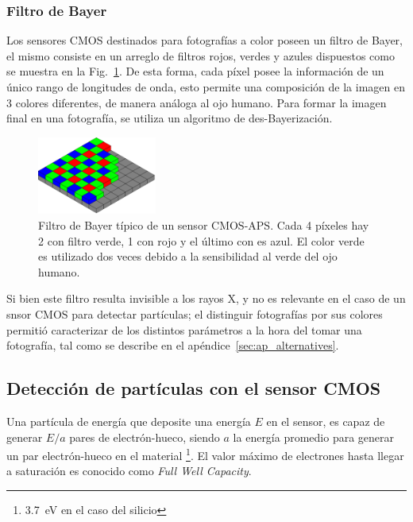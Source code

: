 \documentclass[twoside,twocolumn]{article}
\begin{document}
    \subsubsection*{\hspace{5mm}Filtro de Bayer}\label{sec:intro:bayer}
      Los sensores CMOS destinados para fotografías a color poseen un filtro de Bayer, 
      el mismo consiste en un arreglo de filtros rojos, verdes y azules dispuestos como se muestra en la Fig.~\ref{fig:bayer}.
      De esta forma, cada píxel posee la información de un único rango de longitudes de onda, 
      esto permite una composición de la imagen en 3 colores diferentes, de manera análoga al ojo humano.
      Para formar la imagen final en una fotografía, se utiliza un algoritmo de des-Bayerización.\cite{picamera}

      \begin{figure}[h]
        \centering
        \includegraphics[width=0.35\textwidth]{figures/Bayer_pattern.png}
        \caption{Filtro de Bayer típico de un sensor CMOS-APS. Cada 4 píxeles hay 2 con filtro verde, 1 con rojo y el último con es azul.
          El color verde es utilizado dos veces debido a la sensibilidad al verde del ojo humano.}
        \label{fig:bayer}
      \end{figure}

      Si bien este filtro resulta invisible a los rayos X,
      y no es relevante en el caso de un snsor CMOS para detectar partículas;
      el distinguir fotografías por sus colores permitió caracterizar
      de los distintos parámetros a la hora del tomar una fotografía,
      tal como se describe en el apéndice~\ref{sec:ap_alternatives}.

    \subsection{Detección de partículas con el sensor CMOS}\label{sec:intro:detection}   

      Una partícula de energía que deposite una energía $E$ en el sensor,
      es capaz de generar $E / a$ pares de electrón-hueco,
      siendo $a$ la energía promedio para generar un par electrón-hueco en el material
      \footnote{\SI{3.7}{\eV} en el caso del silicio\cite{groom2004temperature}}.
      El valor máximo de electrones hasta llegar a saturación es conocido como \emph{Full Well Capacity}.
\end{document}
